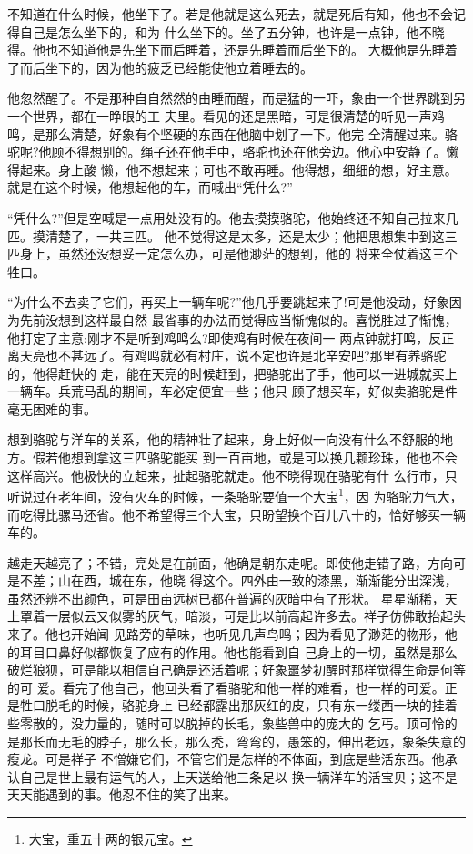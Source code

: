 \documentclass[11pt,a4paper,onecolumn]{article}
\begin{document}
不知道在什么时候，他坐下了。若是他就是这么死去，就是死后有知，他也不会记得自己是怎么坐下的，和为
什么坐下的。坐了五分钟，也许是一点钟，他不晓得。他也不知道他是先坐下而后睡着，还是先睡着而后坐下的。
大概他是先睡着了而后坐下的，因为他的疲乏已经能使他立着睡去的。

他忽然醒了。不是那种自自然然的由睡而醒，而是猛的一吓，象由一个世界跳到另一个世界，都在一睁眼的工
夫里。看见的还是黑暗，可是很清楚的听见一声鸡鸣，是那么清楚，好象有个坚硬的东西在他脑中划了一下。他完
全清醒过来。骆驼呢?他顾不得想别的。绳子还在他手中，骆驼也还在他旁边。他心中安静了。懒得起来。身上酸
懒，他不想起来；可也不敢再睡。他得想，细细的想，好主意。就是在这个时候，他想起他的车，而喊出``凭什么?''

``凭什么?''但是空喊是一点用处没有的。他去摸摸骆驼，他始终还不知自己拉来几匹。摸清楚了，一共三匹。
他不觉得这是太多，还是太少；他把思想集中到这三匹身上，虽然还没想妥一定怎么办，可是他渺茫的想到，他的
将来全仗着这三个牲口。

``为什么不去卖了它们，再买上一辆车呢?''他几乎要跳起来了!可是他没动，好象因为先前没想到这样最自然
最省事的办法而觉得应当惭愧似的。喜悦胜过了惭愧，他打定了主意:刚才不是听到鸡鸣么?即使鸡有时候在夜间一
两点钟就打鸣，反正离天亮也不甚远了。有鸡鸣就必有村庄，说不定也许是北辛安吧?那里有养骆驼的，他得赶快的
走，能在天亮的时候赶到，把骆驼出了手，他可以一进城就买上一辆车。兵荒马乱的期间，车必定便宜一些；他只
顾了想买车，好似卖骆驼是件毫无困难的事。

想到骆驼与洋车的关系，他的精神壮了起来，身上好似一向没有什么不舒服的地方。假若他想到拿这三匹骆驼能买
到一百亩地，或是可以换几颗珍珠，他也不会这样高兴。他极快的立起来，扯起骆驼就走。他不晓得现在骆驼有什
么行市，只听说过在老年间，没有火车的时候，一条骆驼要值一个大宝\footnote{大宝，重五十两的银元宝。}，因
为骆驼力气大，而吃得比骡马还省。他不希望得三个大宝，只盼望换个百儿八十的，恰好够买一辆车的。

越走天越亮了；不错，亮处是在前面，他确是朝东走呢。即使他走错了路，方向可是不差；山在西，城在东，他晓
得这个。四外由一致的漆黑，渐渐能分出深浅，虽然还辨不出颜色，可是田亩远树已都在普遍的灰暗中有了形状。
星星渐稀，天上罩着一层似云又似雾的灰气，暗淡，可是比以前高起许多去。祥子仿佛敢抬起头来了。他也开始闻
见路旁的草味，也听见几声鸟鸣；因为看见了渺茫的物形，他的耳目口鼻好似都恢复了应有的作用。他也能看到自
己身上的一切，虽然是那么破烂狼狈，可是能以相信自己确是还活着呢；好象噩梦初醒时那样觉得生命是何等的可
爱。看完了他自己，他回头看了看骆驼\myrule 和他一样的难看，也一样的可爱。正是牲口脱毛的时候，骆驼身上
已经都露出那灰红的皮，只有东一缕西一块的挂着些零散的，没力量的，随时可以脱掉的长毛，象些兽中的庞大的
乞丐。顶可怜的是那长而无毛的脖子，那么长，那么秃，弯弯的，愚笨的，伸出老远，象条失意的瘦龙。可是祥子
不憎嫌它们，不管它们是怎样的不体面，到底是些活东西。他承认自己是世上最有运气的人，上天送给他三条足以
换一辆洋车的活宝贝；这不是天天能遇到的事。他忍不住的笑了出来。
\end{document}
